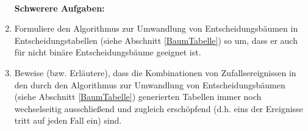 \begin{enumerate}
  ~\\ {\bf Schwerere Aufgaben:}\\
 
 \item \label{Algorithmusaufgabe} Formuliere den Algorithmus zur Umwandlung von
 Entscheidungsbäumen in Entscheidungstabellen (siehe Abschnitt \ref{BaumTabelle}) so um, dass er auch
 für nicht binäre Entscheidungsbäume geeignet ist.
 
 \item Beweise (bzw. Erläutere), dass die Kombinationen von Zufallsereignissen
 in den durch den Algorithmus zur Umwandlung von Entscheidungsbäumen 
(siehe Abschnitt \ref{BaumTabelle}) generierten Tabellen immer noch
wechselseitig ausschließend und zugleich erschöpfend (d.h. eins der Ereignisse tritt auf jeden Fall ein) sind.
 
\end{enumerate}

% 

\newpage